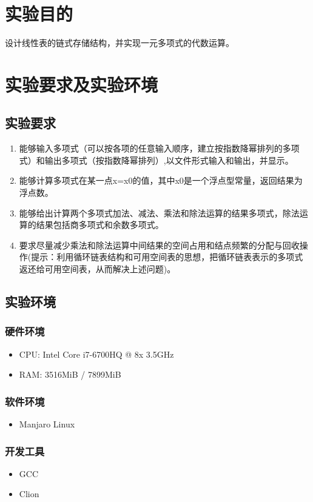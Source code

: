 \section{实验目的}
设计线性表的链式存储结构，并实现一元多项式的代数运算。

\section{实验要求及实验环境}
\subsection{实验要求}
\begin{enumerate}
    \item 能够输入多项式（可以按各项的任意输入顺序，建立按指数降幂排列的多项式）和输出多项式（按指数降幂排列）,以文件形式输入和输出，并显示。
    \item 能够计算多项式在某一点x=x0的值，其中x0是一个浮点型常量，返回结果为浮点数。
    \item 能够给出计算两个多项式加法、减法、乘法和除法运算的结果多项式，除法运算的结果包括商多项式和余数多项式。
    \item 要求尽量减少乘法和除法运算中间结果的空间占用和结点频繁的分配与回收操作(提示：利用循环链表结构和可用空间表的思想，把循环链表表示的多项式返还给可用空间表，从而解决上述问题)。
\end{enumerate}


\subsection{实验环境}
\subsubsection{硬件环境}
\begin{itemize}
    \item CPU: Intel Core i7-6700HQ @ 8x 3.5GHz
    \item RAM: 3516MiB / 7899MiB
\end{itemize}

\subsubsection{软件环境}
\begin{itemize}
    \item Manjaro Linux
\end{itemize}

\subsubsection{开发工具}
\begin{itemize}
    \item GCC
    \item Clion
\end{itemize}